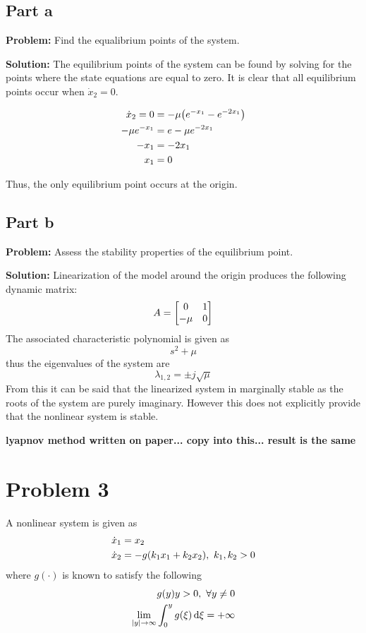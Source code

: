 \documentclass[letter]{article}
\begin{document}
\subsection{Part a}
\textbf{Problem:}
Find the equalibrium points of the system.

\noindent
\textbf{Solution:}
The equilibrium points of the system can be found by solving for the points where the state equations are equal to zero.
It is clear that all equilibrium points occur when $\dot{x}_2 = 0$.

\begin{align}
	\dot{x}_2 = 0 &= - \mu \qty(e^{-x_1} - e^{-2x_1})\\
	-\mu e^{-x_1} &= e -\mu e^{-2x_1}\\
	-x_1 &= -2x_1\\
	x_1 &= 0
\end{align}

Thus, the only equilibrium point occurs at the origin.

\subsection{Part b}
\textbf{Problem:}
Assess the stability properties of the equilibrium point.

\noindent
\textbf{Solution:}
Linearization of the model around the origin produces the following dynamic matrix:
\begin{equation}
	A = \mqty[	0 & 1\\
				-\mu & 0]
\end{equation}
The associated characteristic polynomial is given as $$s^2 + \mu$$ thus the eigenvalues of the system are $$\lambda_{1,2} = \pm j \sqrt{\mu}$$
From this it can be said that the linearized system in marginally stable as the roots of the system are purely imaginary. However this does not explicitly provide that the nonlinear system is stable.



\textbf{lyapnov method written on paper... copy into this... result is the same}







\newpage
\section{Problem 3}
A nonlinear system is given as
\begin{equation}
	\begin{aligned}
		\dot{x}_1 &= x_2\\
		\dot{x}_2 &= -g \qty(k_1 x_1 + k_2 x_2), \ k_1, k_2 > 0
	\end{aligned}
\end{equation}
where $g(\cdot)$ is known to satisfy the following
\begin{equation}
	\begin{aligned}
		g(y) y > 0, \ \forall y \neq 0\\
		\lim_{\abs{y} \to \infty} \int_0^y g(\xi) \dd{\xi}  = + \infty
	\end{aligned}
\end{equation}
\end{document}
